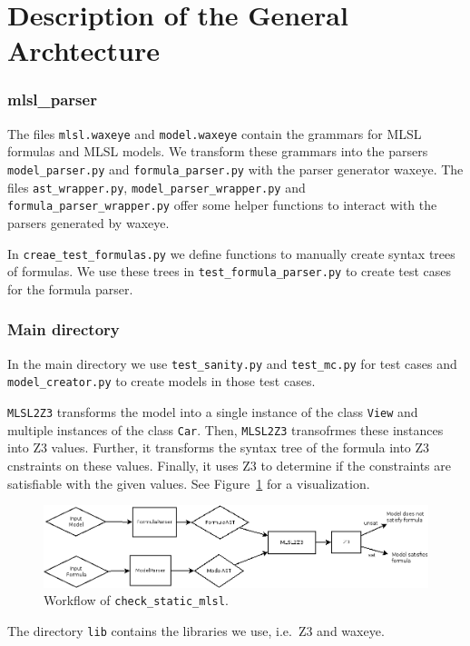 \documentclass[a4paper,10pt]{article}
\title{}
\author{}
\begin{document}

\section*{Description of the General Archtecture}
\subsubsection*{mlsl\_parser}
The files \texttt{mlsl.waxeye} and \texttt{model.waxeye} contain the grammars for MLSL formulas and MLSL models.
We transform these grammars into the parsers \texttt{model\_parser.py} and \texttt{formula\_parser.py} with the parser generator waxeye.
The files \texttt{ast\_wrapper.py}, \texttt{model\_parser\_wrapper.py} and \texttt{formula\_parser\_wrapper.py} offer some helper functions to interact with the parsers generated by waxeye.

In \texttt{creae\_test\_formulas.py} we define functions to manually create syntax trees of formulas.
We use these trees in \texttt{test\_formula\_parser.py} to create test cases for the formula parser.

\subsubsection*{Main directory}
In the main directory we use \texttt{test\_sanity.py} and \texttt{test\_mc.py} for test cases and \texttt{model\_creator.py} to create models in those test cases.

\texttt{MLSL2Z3} transforms the model into a single instance of the class \texttt{View} and multiple instances of the class \texttt{Car}.
Then, \texttt{MLSL2Z3} transofrmes these instances into Z3 values.
Further, it transforms the syntax tree of the formula into Z3 cnstraints on these values.
Finally, it uses Z3 to determine if the constraints are satisfiable with the given values.
See Figure~\ref{fig:workflow} for a visualization.
\begin{figure}
	\includegraphics[scale=0.4]{workflow}
\caption{Workflow of \texttt{check\_static\_mlsl}.}
\label{fig:workflow}
\end{figure} 

The directory \texttt{lib} contains the libraries we use, i.e.\ Z3 and waxeye.
\end{document}
